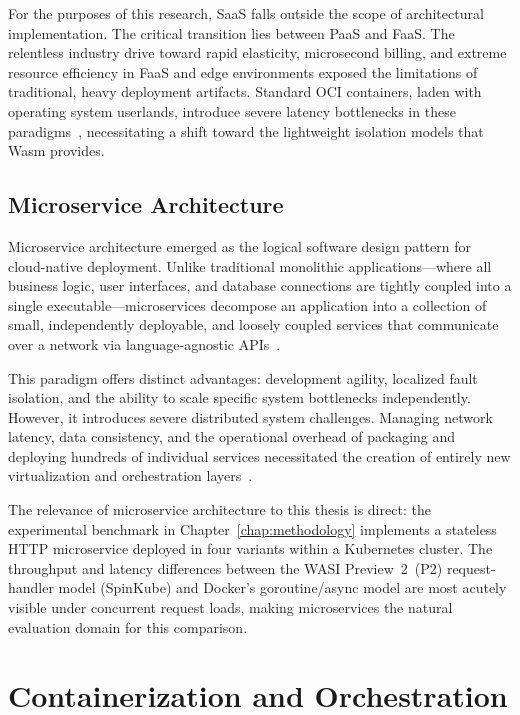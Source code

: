 For the purposes of this research, \acs{SaaS} falls outside the scope of architectural implementation. The critical transition lies between \acs{PaaS} and \acs{FaaS}. The relentless industry drive toward rapid elasticity, microsecond billing, and extreme resource efficiency in \acs{FaaS} and edge environments exposed the limitations of traditional, heavy deployment artifacts. Standard \acs{OCI} containers, laden with operating system userlands, introduce severe latency bottlenecks in these paradigms~\cite{gadepalli2020challenges, jonas2019cloud}, necessitating a shift toward the lightweight isolation models that \acs{Wasm} provides.

\subsection{Microservice Architecture}
Microservice architecture emerged as the logical software design pattern for cloud-native deployment. Unlike traditional monolithic applications---where all business logic, user interfaces, and database connections are tightly coupled into a single executable---microservices decompose an application into a collection of small, independently deployable, and loosely coupled services that communicate over a network via language-agnostic \acp{API}~\cite{newman2015building}.

This paradigm offers distinct advantages: development agility, localized fault isolation, and the ability to scale specific system bottlenecks independently. However, it introduces severe distributed system challenges. Managing network latency, data consistency, and the operational overhead of packaging and deploying hundreds of individual services necessitated the creation of entirely new virtualization and orchestration layers~\cite{newman2015building, burns2016borg}.

The relevance of microservice architecture to this thesis is direct: the experimental benchmark in Chapter~\ref{chap:methodology} implements a stateless \acs{HTTP} microservice deployed in four variants within a Kubernetes cluster. The throughput and latency differences between the \acs{WASI} Preview~2~(P2) request-handler model (SpinKube) and Docker's goroutine/async model are most acutely visible under concurrent request loads, making microservices the natural evaluation domain for this comparison.

\section{Containerization and Orchestration}
\label{sec:containerization}

